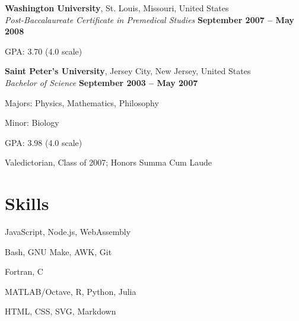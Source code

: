 \documentclass[margin,line]{resume}
\begin{document}
\begin{resume}
	\textbf{Washington University}, St. Louis, Missouri, United States \vspace{1mm}\\
	\textsl{Post-Baccalaureate Certificate in Premedical Studies} \hfill \textbf{ September 2007 -- May 2008} \vspace{1mm}\\
	\vspace{-4mm}
	\begin{list2}
		\item GPA: 3.70 (4.0 scale)
	\end{list2}
	\vspace{-1.5mm}

	\textbf{Saint Peter's University}, Jersey City, New Jersey, United States \vspace{1mm}\\
	\textsl{Bachelor of Science} \hfill \textbf{ September 2003 -- May 2007} \vspace{1mm}\\
	\vspace{-4mm}
	\begin{list2}
		\item Majors: Physics, Mathematics, Philosophy
		\item Minor: Biology
		\item GPA: 3.98 (4.0 scale)
		\item Valedictorian, Class of 2007; Honors Summa Cum Laude
	\end{list2}
	\vspace{-1.5mm}


	\section{\mysidestyle Skills}

	\begin{list2}
		\item JavaScript, Node.js, WebAssembly
		\item Bash, GNU Make, AWK, Git
		\item Fortran, C
		\item MATLAB/Octave, R, Python, Julia
		\item HTML, CSS, SVG, Markdown
	\end{list2}

\end{resume}
\end{document}
